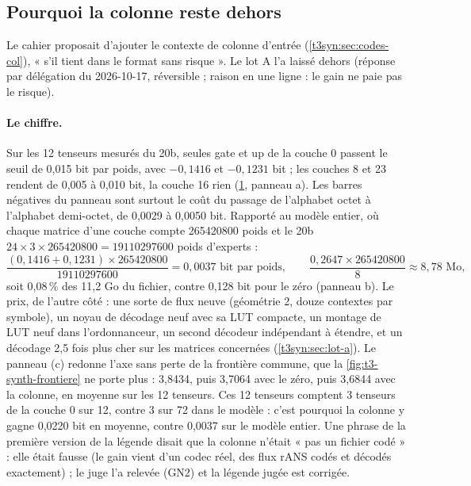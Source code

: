 \subsection{Pourquoi la colonne reste dehors}\label{t3cod:sec:colonne}

Le cahier proposait d'ajouter le contexte de colonne d'entrée (\cref{t3syn:sec:codes-col}), « s'il tient dans le format sans risque ». Le lot A l'a laissé dehors (réponse par délégation du 2026-10-17, réversible ; raison en une ligne : le gain ne paie pas le risque).

\begin{figure}[tbp]
\centering
\GrapheCodonColonne
{}
\label{fig:t3-codon-colonne}
\end{figure}

\paragraph{Le chiffre.} Sur les 12 tenseurs mesurés du 20b, seules gate et up de la couche 0 passent le seuil de 0,015 bit par poids, avec $-0{,}1416$ et $-0{,}1231$ bit ; les couches 8 et 23 rendent de 0,005 à 0,010 bit, la couche 16 rien (\cref{fig:t3-codon-colonne}, panneau a). Les barres négatives du panneau sont surtout le coût du passage de l'alphabet octet à l'alphabet demi-octet, de 0,0029 à 0,0050 bit. Rapporté au modèle entier, où chaque matrice d'une couche compte \num{265420800} poids et le 20b $24 \times 3 \times \num{265420800} = \num{19110297600}$ poids d'experts \calc :
\[
\frac{(0{,}1416 + 0{,}1231) \times \num{265420800}}{\num{19110297600}} = 0{,}0037 \text{ bit par poids}, \qquad \frac{0{,}2647 \times \num{265420800}}{8} \approx 8{,}78 \text{ Mo},
\]
soit 0,08\,\% des 11,2 Go du fichier, contre 0,128 bit pour le zéro (panneau b). Le prix, de l'autre côté : une sorte de flux neuve (géométrie 2, douze contextes par symbole), un noyau de décodage neuf avec sa LUT compacte, un montage de LUT neuf dans l'ordonnanceur, un second décodeur indépendant à étendre, et un décodage 2,5 fois plus cher sur les matrices concernées (\cref{t3syn:sec:lot-a}). Le panneau (c) redonne l'axe sans perte de la frontière commune, que la \cref{fig:t3-synth-frontiere} ne porte plus : 3,8434, puis 3,7064 avec le zéro, puis 3,6844 avec la colonne, en moyenne sur les 12 tenseurs. Ces 12 tenseurs comptent 3 tenseurs de la couche 0 sur 12, contre 3 sur 72 dans le modèle : c'est pourquoi la colonne y gagne 0,0220 bit en moyenne, contre 0,0037 sur le modèle entier. Une phrase de la première version de la légende disait que la colonne n'était « pas un fichier codé » : elle était fausse (le gain vient d'un codec réel, des flux rANS codés et décodés exactement) ; le juge l'a relevée (GN2) et la légende jugée est corrigée.

